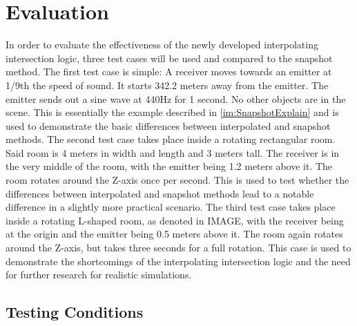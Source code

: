 \chapter{Evaluation}\label{ch:Evaluation}

In order to evaluate the effectiveness of the newly developed interpolating intersection logic,
three test cases will be used and compared to the snapshot method.
\newline
The first test case is simple: A receiver moves towards an emitter at 1/9th the speed of sound.
It starts 342.2 meters away from the emitter.
The emitter sends out a sine wave at 440Hz for 1 second.
No other objects are in the scene.
\newline
This is essentially the example described in \ref{im:SnapshotExplain}
and is used to demonstrate the basic differences between interpolated and snapshot methods.
\newline
The second test case takes place inside a rotating rectangular room.
Said room is 4 meters in width and length and 3 meters tall.
The receiver is in the very middle of the room,
with the emitter being 1.2 meters above it.
The room rotates around the Z-axis once per second.
\newline
This is used to test whether the differences between interpolated and snapshot methods
lead to a notable difference in a slightly more practical scenario.
\newline
The third test case takes place inside a rotating L-shaped room,
as denoted in IMAGE, with the receiver being at the origin
and the emitter being 0.5 meters above it.
The room again rotates around the Z-axis, but takes three seconds for a full rotation.
\newline
This case is used to demonstrate the shortcomings of the interpolating intersection logic
and the need for further research for realistic simulations.

\section{Testing Conditions}

